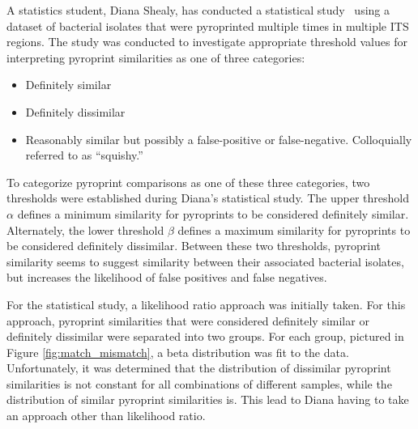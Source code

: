 \documentclass[12pt]{ucthesis}
\begin{document}
      A statistics student, Diana Shealy, has conducted a statistical
      study~\cite{Shealy:SeniorProject} using a dataset of bacterial isolates
      that were pyroprinted multiple times in multiple ITS regions. The
      study was conducted to investigate appropriate threshold values for
      interpreting pyroprint similarities as one of three categories:
      \begin{itemize}
         \item Definitely similar
         \item Definitely dissimilar
         \item Reasonably similar but possibly a false-positive or
               false-negative. Colloquially referred to as ``squishy.''
      \end{itemize}
      To categorize pyroprint comparisons as one of these three categories, two
      thresholds were established during Diana's statistical study. The upper
      threshold $\alpha$ defines a minimum similarity for pyroprints to be
      considered definitely similar. Alternately, the lower threshold $\beta$
      defines a maximum similarity for pyroprints to be considered definitely
      dissimilar. Between these two thresholds, pyroprint similarity seems to
      suggest similarity between their associated bacterial isolates, but
      increases the likelihood of false positives and false negatives.

      For the statistical study, a likelihood ratio approach was initially
      taken. For this approach, pyroprint similarities that were considered
      definitely similar or definitely dissimilar were separated into two
      groups. For each group, pictured in Figure \ref{fig:match_mismatch}, a
      beta distribution was fit to the data. Unfortunately, it was determined
      that the distribution of dissimilar pyroprint similarities is not
      constant for all combinations of different samples, while the
      distribution of similar pyroprint similarities is. This lead to Diana
      having to take an approach other than likelihood ratio.
\end{document}
